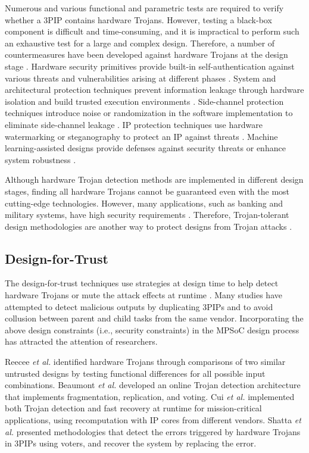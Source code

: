 \documentclass[10pt,journal, compsoc]{IEEEtran}
\begin{document}
Numerous and various functional and parametric tests are required to verify whether a 3PIP contains hardware Trojans. However, testing a black-box component is difficult and time-consuming, and it is impractical to perform such an exhaustive test for a large and complex design. Therefore, a number of countermeasures have been developed against hardware Trojans at the design stage \cite{article:WH}. Hardware security primitives provide built-in self-authentication against various threats and vulnerabilities arising at different phases \cite{article:DM}. System and architectural protection techniques prevent information leakage through hardware isolation and build trusted execution environments \cite{article:NH}. Side-channel protection techniques introduce noise or randomization in the software implementation to eliminate side-channel leakage \cite{conference:HK}. IP protection techniques use hardware watermarking or steganography to protect an IP against threats \cite{article:AS1}. Machine learning-assisted designs provide defenses against security threats or enhance system robustness \cite{article:SY1}.

Although hardware Trojan detection methods are implemented in different design stages, finding all hardware Trojans cannot be guaranteed even with the most cutting-edge technologies. However, many applications, such as banking and military systems, have high security requirements \cite{conference:XZ}. Therefore, Trojan-tolerant design methodologies are another way to protect designs from Trojan attacks \cite{article:KX}.


\subsection{Design-for-Trust}



The design-for-trust techniques use strategies at design time to help detect hardware Trojans or mute the attack effects at runtime \cite{article:JR3}. Many studies have attempted to detect malicious outputs by duplicating 3PIPs and to avoid collusion between parent and child tasks from the same vendor. Incorporating the above design constraints (i.e., security constraints) in the MPSoC design process has attracted the attention of researchers.

Reecee \textit{et al.} \cite{article:TR} identified hardware Trojans through comparisons of two similar untrusted designs by testing functional differences for all possible input combinations. Beaumont \textit{et al.} \cite{conference:MB} developed an online Trojan detection architecture that implements fragmentation, replication, and voting. Cui \textit{et al.} \cite{conference:XC} implemented both Trojan detection and fast recovery at runtime for mission-critical applications, using recomputation with IP cores from different vendors. Shatta \textit{et al.} \cite{conference:MS} presented methodologies that detect the errors triggered by hardware Trojans in 3PIPs using voters, and recover the system by replacing the error.
\end{document}
